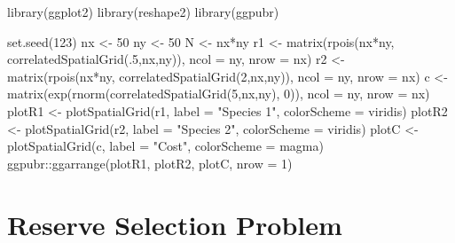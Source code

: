 \documentclass[
]{article}
\newenvironment{Shaded}{\begin{snugshade}}{\end{snugshade}}
\newcommand{\AttributeTok}[1]{\textcolor[rgb]{0.77,0.63,0.00}{#1}}
\newcommand{\DecValTok}[1]{\textcolor[rgb]{0.00,0.00,0.81}{#1}}
\newcommand{\FunctionTok}[1]{\textcolor[rgb]{0.00,0.00,0.00}{#1}}
\newcommand{\NormalTok}[1]{#1}
\newcommand{\OtherTok}[1]{\textcolor[rgb]{0.56,0.35,0.01}{#1}}
\newcommand{\SpecialCharTok}[1]{\textcolor[rgb]{0.00,0.00,0.00}{#1}}
\newcommand{\StringTok}[1]{\textcolor[rgb]{0.31,0.60,0.02}{#1}}
\begin{document}
\begin{Shaded}
\begin{Highlighting}[]
\FunctionTok{library}\NormalTok{(ggplot2)}
\FunctionTok{library}\NormalTok{(reshape2)}
\FunctionTok{library}\NormalTok{(ggpubr)}

\FunctionTok{set.seed}\NormalTok{(}\DecValTok{123}\NormalTok{)}
\NormalTok{nx }\OtherTok{\textless{}{-}} \DecValTok{50}
\NormalTok{ny }\OtherTok{\textless{}{-}} \DecValTok{50}
\NormalTok{N  }\OtherTok{\textless{}{-}}\NormalTok{ nx}\SpecialCharTok{*}\NormalTok{ny}
\NormalTok{r1 }\OtherTok{\textless{}{-}} \FunctionTok{matrix}\NormalTok{(}\FunctionTok{rpois}\NormalTok{(nx}\SpecialCharTok{*}\NormalTok{ny, }\FunctionTok{correlatedSpatialGrid}\NormalTok{(.}\DecValTok{5}\NormalTok{,nx,ny)), }\AttributeTok{ncol =}\NormalTok{ ny, }\AttributeTok{nrow =}\NormalTok{ nx)}
\NormalTok{r2 }\OtherTok{\textless{}{-}} \FunctionTok{matrix}\NormalTok{(}\FunctionTok{rpois}\NormalTok{(nx}\SpecialCharTok{*}\NormalTok{ny, }\FunctionTok{correlatedSpatialGrid}\NormalTok{(}\DecValTok{2}\NormalTok{,nx,ny)), }\AttributeTok{ncol =}\NormalTok{ ny, }\AttributeTok{nrow =}\NormalTok{ nx)}
\NormalTok{c  }\OtherTok{\textless{}{-}} \FunctionTok{matrix}\NormalTok{(}\FunctionTok{exp}\NormalTok{(}\FunctionTok{rnorm}\NormalTok{(}\FunctionTok{correlatedSpatialGrid}\NormalTok{(}\DecValTok{5}\NormalTok{,nx,ny), }\DecValTok{0}\NormalTok{)), }\AttributeTok{ncol =}\NormalTok{ ny, }\AttributeTok{nrow =}\NormalTok{ nx)}
\NormalTok{plotR1 }\OtherTok{\textless{}{-}} \FunctionTok{plotSpatialGrid}\NormalTok{(r1, }\AttributeTok{label =} \StringTok{"Species 1"}\NormalTok{, }\AttributeTok{colorScheme =} \StringTok{\textquotesingle{}viridis\textquotesingle{}}\NormalTok{)}
\NormalTok{plotR2 }\OtherTok{\textless{}{-}} \FunctionTok{plotSpatialGrid}\NormalTok{(r2, }\AttributeTok{label =} \StringTok{"Species 2"}\NormalTok{, }\AttributeTok{colorScheme =} \StringTok{\textquotesingle{}viridis\textquotesingle{}}\NormalTok{)}
\NormalTok{plotC  }\OtherTok{\textless{}{-}} \FunctionTok{plotSpatialGrid}\NormalTok{(c, }\AttributeTok{label =} \StringTok{"Cost"}\NormalTok{, }\AttributeTok{colorScheme =} \StringTok{\textquotesingle{}magma\textquotesingle{}}\NormalTok{)}
\NormalTok{ggpubr}\SpecialCharTok{::}\FunctionTok{ggarrange}\NormalTok{(plotR1, plotR2, plotC, }\AttributeTok{nrow =} \DecValTok{1}\NormalTok{)}
\end{Highlighting}
\end{Shaded}

\hypertarget{reserve-selection-problem}{%
\section{Reserve Selection Problem}\label{reserve-selection-problem}}
\end{document}
